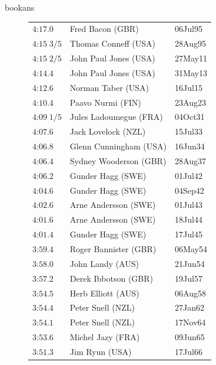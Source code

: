 \begin{exercises}
\begin{Filesave}{bookans}
\begin{figure}
{{\begin{tabular}[t]{|l|ll|}
           $\text{4:17}.0$      &Fred Bacon (GBR)           &06Jul95 \\
           $\text{4:15}\;3/5$   &Thomas Conneff (USA)       &28Aug95 \\
           $\text{4:15}\;2/5$   &John Paul Jones (USA)      &27May11 \\
           $\text{4:14}.4$      &John Paul Jones (USA)      &31May13 \\
           $\text{4:12}.6$      &Norman Taber (USA)         &16Jul15 \\
           $\text{4:10}.4$      &Paavo Nurmi (FIN)          &23Aug23 \\
           $\text{4:09}\;1/5$   &Jules Ladoumegue (FRA)     &04Oct31 \\
           $\text{4:07}.6$      &Jack Lovelock (NZL)        &15Jul33 \\
           $\text{4:06}.8$      &Glenn Cunningham (USA)     &16Jun34 \\
           $\text{4:06}.4$      &Sydney Wooderson (GBR)     &28Aug37 \\
           $\text{4:06}.2$      &Gunder Hagg (SWE)          &01Jul42 \\
           $\text{4:04}.6$      &Gunder Hagg (SWE)          &04Sep42 \\
           $\text{4:02}.6$      &Arne Andersson (SWE)       &01Jul43 \\
           $\text{4:01}.6$      &Arne Andersson (SWE)       &18Jul44 \\
           $\text{4:01}.4$      &Gunder Hagg (SWE)          &17Jul45 \\
           $\text{3:59}.4$      &Roger Bannister (GBR)      &06May54 \\
           $\text{3:58}.0$      &John Landy (AUS)           &21Jun54 \\
           $\text{3:57}.2$      &Derek Ibbotson (GBR)       &19Jul57 \\
           $\text{3:54}.5$      &Herb Elliott (AUS)         &06Aug58 \\
           $\text{3:54}.4$      &Peter Snell (NZL)          &27Jan62 \\ 
           $\text{3:54}.1$      &Peter Snell (NZL)          &17Nov64 \\
           $\text{3:53}.6$      &Michel Jazy (FRA)          &09Jun65 \\
           $\text{3:51}.3$      &Jim Ryun (USA)             &17Jul66 \\

\end{tabular}}}
\end{figure}
\end{Filesave}
\end{exercises}
